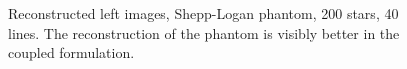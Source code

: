 \begin{enumerate}
\vspace{-0.2in}
\begin{figure}[H]
\hspace{0.4in}
\hspace{0.2in}
\caption [Reconstructed left images, Shepp-Logan phantom, 200 stars, 40 lines]{Reconstructed left images, Shepp-Logan phantom, 200 stars, 40 lines. The reconstruction of the phantom is visibly better in the coupled formulation.}
\label{fig:expt55}
\end{figure}



\end{enumerate}
